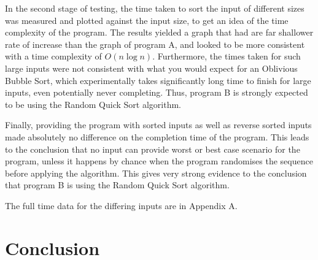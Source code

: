 \documentclass[a4paper]{article}
\newcommand{\ds}{\displaystyle}
\begin{document}
In the second stage of testing, the time taken to sort the input of different sizes was measured and plotted against the input size, to get an idea of the time complexity of the program. The results yielded a graph that had are far shallower rate of increase than the graph of program A, and looked to be more consistent with a time complexity of $\ds{O(n\log{n})}$. Furthermore, the times taken for such large inputs were not consistent with what you would expect for an Oblivious Bubble Sort, which experimentally takes significantly long time to finish for large inputs, even potentially never completing. Thus, program B is strongly expected to be using the Random Quick Sort algorithm.

Finally, providing the program with sorted inputs as well as reverse sorted inputs made absolutely no difference on the completion time of the program. This leads to the conclusion that no input can provide worst or best case scenario for the program, unless it happens by chance when the program randomises the sequence before applying the algorithm. This gives very strong evidence to the conclusion that program B is using the Random Quick Sort algorithm.

The full time data for the differing inputs are in Appendix A.

\section{Conclusion}
\end{document}
